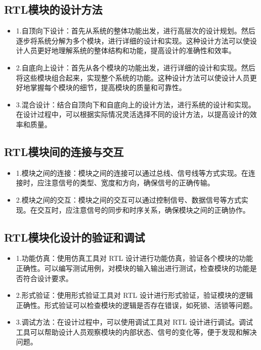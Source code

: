 \subsection{RTL模块的设计方法}\label{sec:16-chip-frontend-014}

\begin{itemize}
\item
  1.自顶向下设计：首先从系统的整体功能出发，进行高层次的设计规划。然后逐步将系统分解为多个模块，进行详细的设计和实现。这种设计方法可以使设计人员更好地理解系统的整体结构和功能，提高设计的准确性和效率。
\item
  2.自底向上设计：首先从各个模块的功能出发，进行详细的设计和实现。然后将这些模块组合起来，实现整个系统的功能。这种设计方法可以使设计人员更好地掌握每个模块的细节，提高模块的质量和可靠性。
\item
  3.混合设计：结合自顶向下和自底向上的设计方法，进行系统的设计和实现。在设计过程中，可以根据实际情况灵活选择不同的设计方法，以提高设计的效率和质量。
\end{itemize}

\subsection{RTL模块间的连接与交互}\label{sec:16-chip-frontend-015}

\begin{itemize}
\item
  1.模块之间的连接：模块之间的连接可以通过总线、信号线等方式实现。在连接时，应注意信号的类型、宽度和方向，确保信号的正确传输。
\item
  2.模块之间的交互：模块之间的交互可以通过控制信号、数据信号等方式实现。在交互时，应注意信号的同步和时序关系，确保模块之间的正确协作。
\end{itemize}

\subsection{RTL模块化设计的验证和调试}\label{sec:16-chip-frontend-016}

\begin{itemize}
\item
  1.功能仿真：使用仿真工具对 RTL
  设计进行功能仿真，验证各个模块的功能正确性。可以编写测试用例，对模块的输入输出进行测试，检查模块的功能是否符合设计要求。
\item
  2.形式验证：使用形式验证工具对 RTL
  设计进行形式验证，验证模块的逻辑正确性。形式验证可以检查模块的逻辑是否存在错误，如死锁、活锁等问题。
\item
  3.调试方法：在设计过程中，可以使用调试工具对 RTL
  设计进行调试。调试工具可以帮助设计人员观察模块的内部状态、信号的变化等，便于发现和解决问题。
\end{itemize}


